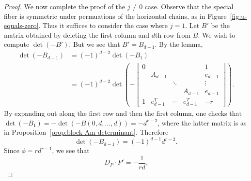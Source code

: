 \documentclass[reqno]{amsart}
\newtheorem{proposition}[thm]{Proposition}
\theoremstyle{definition}
\theoremstyle{remark}
\begin{document}
\begin{proof}
  We now complete the proof of the $j \neq 0$ case. Observe that the special fiber is symmetric under permuations of the horizontal chains, as in Figure~\ref{fig:u-equals-zero}. Thus it suffices to consider the case where $j = 1$. Let $B'$ be the matrix obtained by deleting the first column and $d$th row from $B$. We wish to compute $\det (-B')$. But we see that $B' = B_{d-1}$. By the lemma, 
  \begin{align*}
    \det (-B_{d-1}) &= (-1)^{d-2} \det (-B_1) \\
    &= (-1)^{d-2} \det \left(- \left[
      \begin{array}{cccccc}
        0 & & & & 1 \\
         & A_{d-1} & & & e_{d-1} \\
         & & \ddots & & \vdots \\
         & & & A_{d-1} & e_{d-1} \\
         1 & e_{d-1}^T & \cdots & e_{d-1}^T & -r
      \end{array}\right]\right).
  \end{align*}
  By expanding out along the first row and then the first column, one checks that $\det (-B_1) = -\det (-B(0,d, \dots, d)) = -d^{r-2}$, where the latter matrix is as in Proposition~\ref{prop:block-Am-determinant}. Therefore
  \[
  \det (-B_{d-1}) = (-1)^{d-1} d^{r-2}.
  \]
  Since $\phi = rd^{r-1}$, we see that 
  \[
  D_P \cdot P' = -\frac{1}{rd}.
  \]
\end{proof}




   
\end{document}
